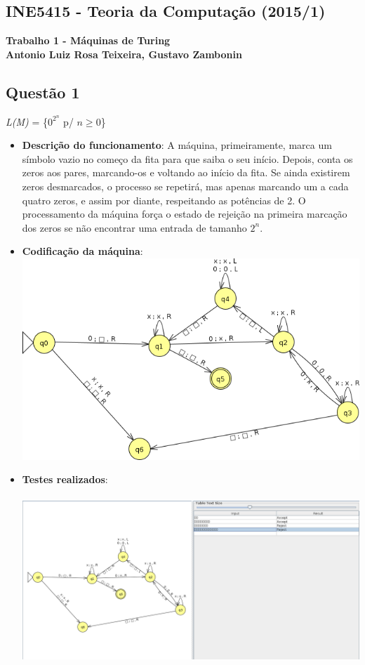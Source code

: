 \documentclass{article}
\begin{document}
\begin{center}
    \section*{INE5415 - Teoria da Computação (2015/1)}
    \textbf{Trabalho 1 - Máquinas de Turing \\
    Antonio Luiz Rosa Teixeira, Gustavo Zambonin}
\end{center}

\subsection*{Questão 1}
\textit{L(M)} = \{$0^{2^{n}}$ p/ $n \geq 0$\}
\begin{itemize}
    \item \textbf{Descrição do funcionamento}: A máquina, primeiramente, marca
    um símbolo vazio no começo da fita para que saiba o seu início. Depois,
    conta os zeros aos pares, marcando-os e voltando ao início da fita. Se
    ainda existirem zeros desmarcados, o processo se repetirá, mas apenas
    marcando um a cada quatro zeros, e assim por diante, respeitando as
    potências de 2. O processamento da máquina força o estado de rejeição na
    primeira marcação dos zeros se não encontrar uma entrada de tamanho $2^{n}$.
    \item \textbf{Codificação da máquina}: \\
    \includegraphics[scale=0.5]{questao1_ss.png}
    \item \textbf{Testes realizados}: \\ \\
    \includegraphics[width=\textwidth]{questao1_inputs.png}
\end{itemize}
\newpage
\end{document}
